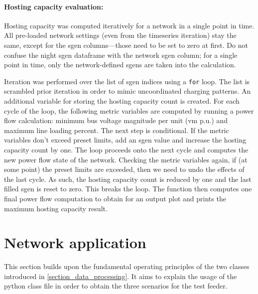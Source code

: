 \documentclass[a4paper,10pt]{report}
\begin{document}
\paragraph{Hosting capacity evaluation:} Hosting capacity was computed iteratively for a network in a single point in time. All pre-loaded network settings (even from the timeseries iteration) stay the same, except for the sgen columns---those need to be set to zero at first. Do not confuse the night sgen dataframe with the network sgen column; for a single point in time, only the network-defined sgens are taken into the calculation.

Iteration was performed over the list of sgen indices using a \texttt{for} loop. The list is scrambled prior iteration in order to mimic uncoordinated charging patterns. An additional variable for storing the hosting capacity count is created. For each cycle of the loop, the following metric variables are computed by running a power flow calculation: minimum bus voltage magnitude per unit (vm p.u.) and maximum line loading percent. The next step is conditional. If the metric variables don't exceed preset limits, add an sgen value and increase the hosting capacity count by one. The loop proceeds onto the next cycle and computes the new power flow state of the network. Checking the metric variables again, if (at some point) the preset limits are exceeded, then we need to undo the effects of the last cycle. As such, the hosting capacity count is reduced by one and the last filled sgen is reset to zero. This breaks the loop. The function then computes one final power flow computation to obtain for an output plot and prints the maximum hosting capacity result.

\section{Network application}\label{section_network_application}
This section builds upon the fundamental operating principles of the two classes introduced in \cref{section_data_processing}. It aims to explain the usage of the python class file in order to obtain the three scenarios for the test feeder.

\end{document}
